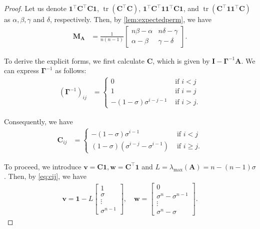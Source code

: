 \documentclass{article}
\theoremstyle{plain}
\theoremstyle{definition}
\theoremstyle{remark}
\newcommand{\mGamma}{\bm{\Gamma}}
\def\vone{{\bm{1}}}
\def\vv{{\bm{v}}}
\def\vw{{\bm{w}}}
\def\mA{{\bm{A}}}
\def\mC{{\bm{C}}}
\def\mI{{\bm{I}}}
\def\mM{{\bm{M}}}
\DeclareMathOperator{\tr}{tr}
\begin{document}
\begin{proof}
Let us denote $\vone^{\top} \mC^{\top} \mC \vone$, $\tr (\mC^{\top} \mC)$, $\vone^{\top} \mC^{\top} \vone \vone^{\top} \mC \vone$, and $\tr (\mC^{\top} \vone \vone^{\top} \mC)$ as $\alpha, \beta, \gamma$ and $\delta$, respectively. Then, by \cref{lem:expectedperm}, we have 
\begin{align*}
    \mM_{\mA} &= \frac{1}{n(n-1)}
    \begin{bmatrix}
        n\beta-\alpha & n\delta-\gamma \\
        \alpha-\beta & \gamma-\delta
    \end{bmatrix}.
\end{align*}

To derive the explicit forms, we first calculate $\mC$, which is given by $\mI - \mGamma^{-1} \mA$.
We can express $\mGamma^{-1}$ as follows:
\begin{align*}
    (\mGamma^{-1})_{ij} &=
    \begin{cases}
        0 & \text{ if } i < j\\
        1 & \text{ if } i = j\\
        -(1-\sigma) \sigma^{i-j-1} & \text{ if }  i > j.
    \end{cases}
\end{align*}

Consequently, we have 
\begin{align}
    \label{eq:cij}
    \mC_{ij} &=
    \begin{cases}
        -(1-\sigma) \sigma^{i-1} & \text{ if } i < j\\
        (1-\sigma) (\sigma^{i-j}-\sigma^{i-1}) & \text{ if } i \ge j.
    \end{cases}
\end{align}

To proceed, we introduce $\vv = \mC \vone, \vw = \mC^{\top} \vone$ and $L = \lambda_{\max}(\mA) = n - (n-1)\sigma$. 
Then, by \cref{eq:cij}, we have 
\begin{align*}
    \vv = \vone - L 
    \begin{bmatrix}
        1\\
        \sigma\\
        \vdots\\
        \sigma^{n-1}
    \end{bmatrix}, \quad 
    \vw = 
    \begin{bmatrix}
        0\\
        \sigma^n - \sigma^{n-1}\\
        \vdots\\
        \sigma^n - \sigma
    \end{bmatrix}.
\end{align*}


\end{proof}
\end{document}
